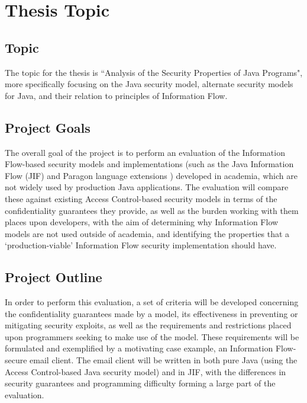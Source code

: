 \section{Thesis Topic}

\subsection{Topic}

The topic for the thesis is ``Analysis of the Security Properties of Java Programs", more specifically focusing on the Java security model, alternate security models for Java, and their relation to principles of Information Flow. 

\subsection{Project Goals}

The overall goal of the project is to perform an evaluation of the Information Flow-based security models and implementations (such as the Java Information Flow (JIF) and Paragon language extensions \cite{pullicino2014jif}\cite{broberg2013paragon}) developed in academia, which are not widely used by production Java applications. The evaluation will compare these against existing Access Control-based security models in terms of the confidentiality guarantees they provide, as well as the burden working with them places upon developers, with the aim of determining why Information Flow models are not used outside of academia, and identifying the properties that a `production-viable' Information Flow security implementation should have.

\subsection{Project Outline}

In order to perform this evaluation, a set of criteria will be developed concerning the confidentiality guarantees made by a model, its effectiveness in preventing or mitigating security exploits, as well as the requirements and restrictions placed upon programmers seeking to make use of the model. These requirements will be formulated and exemplified by a motivating case example, an Information Flow-secure email client. The email client will be written in both pure Java (using the Access Control-based Java security model) and in JIF, with the differences in security guarantees and programming difficulty forming a large part of the evaluation.

